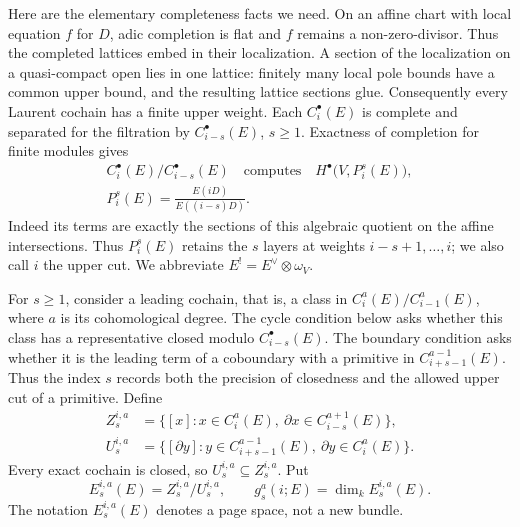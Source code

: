 Here are the elementary completeness facts we need. On an affine
chart with local equation $f$ for $D$, adic completion is flat and
$f$ remains a non-zero-divisor. Thus the completed lattices embed
in their localization. A section of the localization on a
quasi-compact open lies in one lattice: finitely many local pole
bounds have a common upper bound, and the resulting lattice
sections glue. Consequently every Laurent cochain has a finite
upper weight. Each $C_i^\bullet(E)$ is complete and separated for
the filtration by $C_{i-s}^\bullet(E)$, $s\geq1$. Exactness of
completion for finite modules gives
\begin{equation}\label{eq:jet-quotient}
 \begin{gathered}
 C_i^\bullet(E)/C_{i-s}^\bullet(E)
 \quad\text{computes}\quad H^\bullet\bigl(V,P_i^s(E)\bigr),\\
 P_i^s(E)=\frac{E(iD)}{E((i-s)D)}.
\end{gathered}
\end{equation}
Indeed its terms are exactly the sections of this algebraic
quotient on the affine intersections. Thus $P_i^s(E)$ retains
the $s$ layers at weights $i-s+1,\ldots,i$; we also call $i$
the upper cut. We abbreviate
$E^!=E^\vee\otimes\omega_V$.

For $s\geq1$, consider a leading cochain, that is, a class in
$C_i^a(E)/C_{i-1}^a(E)$, where $a$ is its cohomological degree.
The cycle condition below asks whether this class has a representative
closed modulo $C_{i-s}^\bullet(E)$. The boundary condition asks whether
it is the leading term of a coboundary with a primitive in
$C_{i+s-1}^{a-1}(E)$. Thus the index $s$ records both the precision
of closedness and the allowed upper cut of a primitive. Define
\begin{align*}
 Z_s^{i,a}&=
 \{[x]:x\in C_i^a(E),\ \partial x\in C_{i-s}^{a+1}(E)\},\\
 U_s^{i,a}&=
 \{[\partial y]:y\in C_{i+s-1}^{a-1}(E),\
                         \partial y\in C_i^a(E)\}.
\end{align*}
Every exact cochain is closed, so $U_s^{i,a}\subseteq Z_s^{i,a}$.
Put
\[
 E_s^{i,a}(E)=Z_s^{i,a}/U_s^{i,a},\qquad
 g_s^a(i;E)=\dim_k E_s^{i,a}(E).
\]
The notation $E_s^{i,a}(E)$ denotes a page space, not a new bundle.

